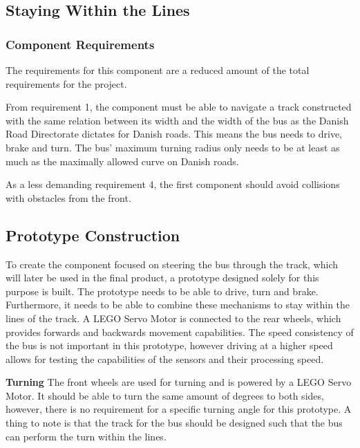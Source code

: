 \subsection{Staying Within the Lines}

\subsubsection{Component Requirements}
The requirements for this component are a reduced amount of the total requirements for the project.

From requirement 1, the component must be able to navigate a track constructed with the same relation between its width and the width of the bus as the Danish Road Directorate dictates for Danish roads. This means the bus needs to drive, brake and turn. The bus' maximum turning radius only needs to be at least as much as the maximally allowed curve on Danish roads. 

As a less demanding requirement 4, the first component should avoid collisions with obstacles from the front. 

\subsection{Prototype Construction}
To create the component focused on steering the bus through the track, which will later be used in the final product, a prototype designed solely for this purpose is built. The prototype needs to be able to drive, turn and brake. Furthermore, it needs to be able to combine these mechanisms to stay within the lines of the track. A LEGO Servo Motor is connected to the rear wheels, which provides forwards and backwards movement capabilities. The speed consistency of the bus is not important in this prototype, however driving at a higher speed allows for testing the capabilities of the sensors and their processing speed.

\textbf{Turning}\newline
The front wheels are used for turning and is powered by a LEGO Servo Motor. It should be able to turn the same amount of degrees to both sides, however, there is no requirement for a specific turning angle for this prototype. A thing to note is that the track for the bus should be designed such that the bus can perform the turn within the lines.

